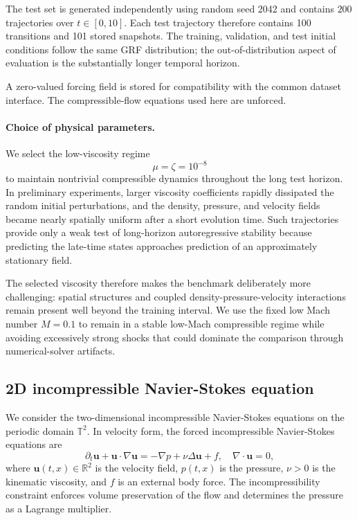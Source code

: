 \documentclass[11pt]{article}
\begin{document}
The test set is generated independently using random seed 2042 and contains $200$ trajectories over $t\in[0,10]$.
Each test trajectory therefore contains 100 transitions and 101 stored snapshots. The training, validation, and test initial conditions follow the same GRF distribution; the out-of-distribution aspect of evaluation is the substantially longer temporal horizon.

A zero-valued forcing field is stored for compatibility with the common dataset interface. The compressible-flow equations used here are unforced.

\paragraph{Choice of physical parameters.}
We select the low-viscosity regime
\[
    \mu=\zeta=10^{-8}
\]
to maintain nontrivial compressible dynamics throughout the long test horizon. In preliminary experiments, larger viscosity coefficients rapidly dissipated the random initial perturbations, and the density, pressure, and velocity fields became nearly spatially uniform after a short evolution time. Such trajectories provide only a weak test of long-horizon autoregressive stability because predicting the late-time states approaches prediction of an approximately stationary field.

The selected viscosity therefore makes the benchmark deliberately more challenging: spatial structures and coupled density-pressure-velocity interactions remain present well beyond the training interval. We use the fixed low Mach number $M=0.1$ to remain in a stable low-Mach compressible regime while avoiding excessively strong shocks that could dominate the comparison through numerical-solver artifacts.



\subsection{2D incompressible Navier-Stokes equation} 
We consider the two-dimensional incompressible Navier-Stokes equations on the periodic domain $\mathbb{T}^2$. In velocity form, the forced incompressible Navier-Stokes equations are
\begin{equation}
    \partial_t\mathbf{u} + \mathbf{u}\cdot\nabla\mathbf{u}
    = -\nabla p + \nu \Delta\mathbf{u} + f,\quad \nabla\cdot\mathbf{u} = 0,
\label{eq:ns2d_velocity}
\end{equation}
where $\mathbf{u}(t,x)\in\mathbb{R}^2$ is the velocity field, $p(t,x)$ is the pressure, $\nu>0$ is the kinematic viscosity, and $f$ is an external body force. The incompressibility constraint enforces volume preservation of the flow and determines the pressure as a Lagrange multiplier.
\end{document}
